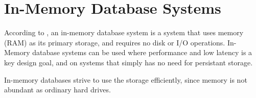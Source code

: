 \section{In-Memory Database Systems}
\label{sec:imds}
According to \cite{Zicari2012-is}, an in-memory database system is a system that uses memory (RAM) as its primary storage, and requires no disk or I/O operations. In-Memory database systems can be used where performance and low latency is a key design goal, and on systems that simply has no need for persistant storage.

In-memory databases strive to use the storage efficiently, since memory is not abundant as ordinary hard drives.
